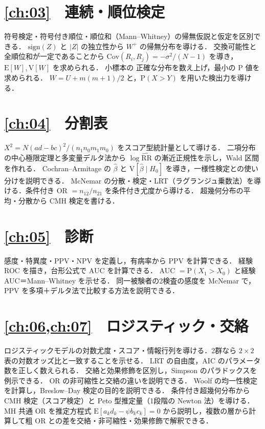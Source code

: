 \documentclass[a4paper,11pt,openany]{ltjsbook}
\newcommand{\E}{\mathrm{E}}
\newcommand{\V}{\mathrm{V}}
\newcommand{\Cov}{\mathrm{Cov}}
\newcommand{\Prob}{\mathrm{P}}
\newcommand{\RR}{\mathrm{RR}}
\begin{document}
\section*{\cref{ch:03}　連続・順位検定}
\begin{itemize}
\chk 符号検定・符号付き順位・順位和（Mann--Whitney）の帰無仮説と仮定を区別できる．
\chk $\mathrm{sign}(Z)$ と $|Z|$ の独立性から $W^+$ の帰無分布を導ける．
\chk 交換可能性と全順位和が一定であることから $\Cov(R_i,R_j)=-\sigma^2/(N-1)$ を導き，$\E[W],\V[W]$ を求められる．
\chk 小標本の 正確な分布を数え上げ，最小の P 値を求められる．
\chk $W=U+m(m+1)/2$ と，$\Prob(X>Y)$ を用いた検出力を導ける．
\end{itemize}
\section*{\cref{ch:04}　分割表}
\begin{itemize}
\chk $X^2=N(ad-bc)^2/(n_1n_0m_1m_0)$ をスコア型統計量として導ける．
\chk 二項分布の中心極限定理と多変量デルタ法から $\log\widehat{\RR}$ の漸近正規性を示し，Wald 区間を作れる．
\chk Cochran--Armitage の $\hat\beta$ と $\V[\hat\beta\mid H_0]$ を導き，一様性検定との使い分けを説明できる．
\chk McNemar の分散・検定・LRT（ラグランジュ乗数法）を導ける．条件付き OR $=n_{12}/n_{21}$ を条件付き尤度から導ける．
\chk 超幾何分布の平均・分散から CMH 検定を書ける．
\end{itemize}
\section*{\cref{ch:05}　診断}
\begin{itemize}
\chk 感度・特異度・PPV・NPV を定義し，有病率から PPV を計算できる．
\chk 経験 ROC を描き，台形公式で AUC を計算できる．
\chk AUC $=\Prob(X_1>X_0)$ と経験 AUC＝Mann--Whitney を示せる．
\chk 同一被験者の2検査の感度を McNemar で，PPV を多項＋デルタ法で比較する方法を説明できる．
\end{itemize}
\section*{\cref{ch:06,ch:07}　ロジスティック・交絡}
\begin{itemize}
\chk ロジスティックモデルの対数尤度・スコア・情報行列を導ける．2群なら $2\times2$ 表の対数オッズ比と一致することを示せる．
\chk LRT の自由度，AIC のパラメータ数を正しく数えられる．
\chk 交絡と効果修飾を区別し，Simpson のパラドックスを例示できる．
\chk OR の非可縮性と交絡の違いを説明できる．
\chk Woolf の均一性検定を計算し，Breslow--Day 検定の目的を説明できる．
\chk 条件付き超幾何分布から CMH 検定（スコア検定）と Peto 型推定量（1段階の Newton 法）を導ける．
\chk MH 共通 OR を推定方程式 $\E[a_kd_k-\psi b_kc_k]=0$ から説明し，複数の層から計算して粗 OR との差を交絡・非可縮性・効果修飾で解釈できる．
\end{itemize}
\end{document}
